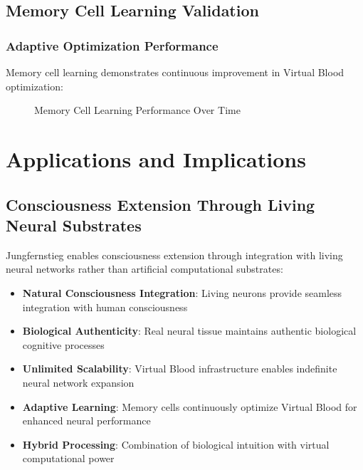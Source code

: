 \documentclass[12pt,a4paper]{article}
\begin{document}
\subsection{Memory Cell Learning Validation}

\subsubsection{Adaptive Optimization Performance}

Memory cell learning demonstrates continuous improvement in Virtual Blood optimization:

\begin{figure}[h]
\centering
{}
\caption{Memory Cell Learning Performance Over Time}
\end{figure}

\section{Applications and Implications}

\subsection{Consciousness Extension Through Living Neural Substrates}

Jungfernstieg enables consciousness extension through integration with living neural networks rather than artificial computational substrates:

\begin{itemize}
\item \textbf{Natural Consciousness Integration}: Living neurons provide seamless integration with human consciousness
\item \textbf{Biological Authenticity}: Real neural tissue maintains authentic biological cognitive processes
\item \textbf{Unlimited Scalability}: Virtual Blood infrastructure enables indefinite neural network expansion
\item \textbf{Adaptive Learning}: Memory cells continuously optimize Virtual Blood for enhanced neural performance
\item \textbf{Hybrid Processing}: Combination of biological intuition with virtual computational power
\end{itemize}
\end{document}
